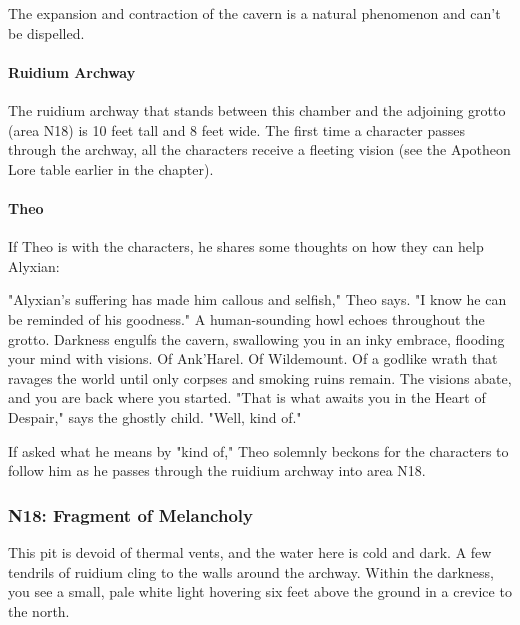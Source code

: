 \documentclass[letterpaper, 11pt, bg=full, twocolumn]{dndbook}
\begin{document}
The expansion and contraction of the cavern is a natural phenomenon and can't be dispelled.

\paragraph{Ruidium Archway}

The ruidium archway that stands between this chamber and the adjoining grotto (area N18) is 10 feet tall and 8 feet wide. The first time a character passes through the archway, all the characters receive a fleeting vision (see the Apotheon Lore table earlier in the chapter).

\paragraph{Theo}

If Theo is with the characters, he shares some thoughts on how they can help Alyxian:

\begin{DndReadAloud}
"Alyxian's suffering has made him callous and selfish," Theo says. "I know he can be reminded of his goodness."
A human-sounding howl echoes throughout the grotto. Darkness engulfs the cavern, swallowing you in an inky embrace, flooding your mind with visions. Of Ank'Harel. Of Wildemount. Of a godlike wrath that ravages the world until only corpses and smoking ruins remain. The visions abate, and you are back where you started. "That is what awaits you in the Heart of Despair," says the ghostly child. "Well, kind of."
\end{DndReadAloud}

If asked what he means by "kind of," Theo solemnly beckons for the characters to follow him as he passes through the ruidium archway into area N18.


\subsubsection{N18: Fragment of Melancholy}

\begin{DndReadAloud}
This pit is devoid of thermal vents, and the water here is cold and dark. A few tendrils of ruidium cling to the walls around the archway. Within the darkness, you see a small, pale white light hovering six feet above the ground in a crevice to the north.
\end{DndReadAloud}
\end{document}
